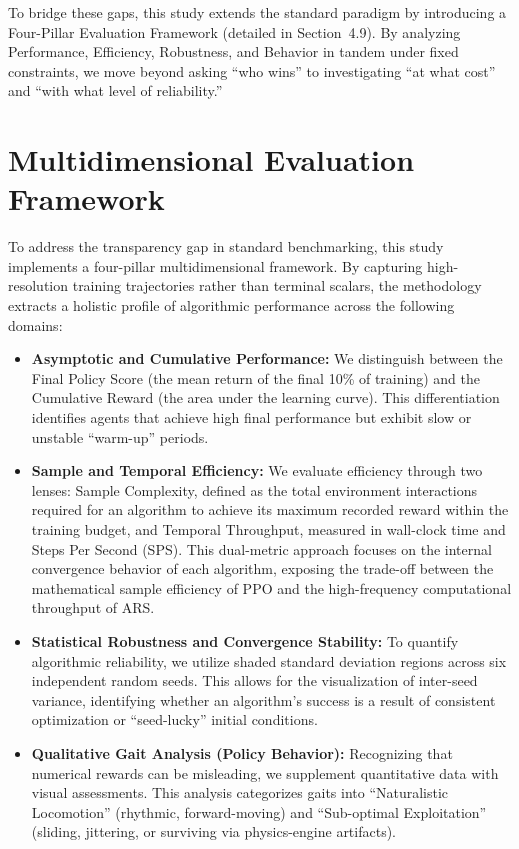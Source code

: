 To bridge these gaps, this study extends the standard paradigm by introducing a Four-Pillar Evaluation Framework (detailed in Section~4.9). By analyzing Performance, Efficiency, Robustness, and Behavior in tandem under fixed constraints, we move beyond asking ``who wins'' to investigating ``at what cost'' and ``with what level of reliability.''
\section{Multidimensional Evaluation Framework}

To address the transparency gap in standard benchmarking, this study implements a four-pillar multidimensional framework. By capturing high-resolution training trajectories rather than terminal scalars, the methodology extracts a holistic profile of algorithmic performance across the following domains:

\begin{itemize}
    \item \textbf{Asymptotic and Cumulative Performance:} We distinguish between the Final Policy Score (the mean return of the final 10\% of training) and the Cumulative Reward (the area under the learning curve). This differentiation identifies agents that achieve high final performance but exhibit slow or unstable ``warm-up'' periods.
    
    \item \textbf{Sample and Temporal Efficiency:} We evaluate efficiency through two lenses: Sample Complexity, defined as the total environment interactions required for an algorithm to achieve its maximum recorded reward within the training budget, and Temporal Throughput, measured in wall-clock time and Steps Per Second (SPS). This dual-metric approach focuses on the internal convergence behavior of each algorithm, exposing the trade-off between the mathematical sample efficiency of PPO and the high-frequency computational throughput of ARS.
    
    \item \textbf{Statistical Robustness and Convergence Stability:} To quantify algorithmic reliability, we utilize shaded standard deviation regions across six independent random seeds. This allows for the visualization of inter-seed variance, identifying whether an algorithm’s success is a result of consistent optimization or ``seed-lucky'' initial conditions.
    
    \item \textbf{Qualitative Gait Analysis (Policy Behavior):} Recognizing that numerical rewards can be misleading, we supplement quantitative data with visual assessments. This analysis categorizes gaits into ``Naturalistic Locomotion'' (rhythmic, forward-moving) and ``Sub-optimal Exploitation'' (sliding, jittering, or surviving via physics-engine artifacts).
\end{itemize}


